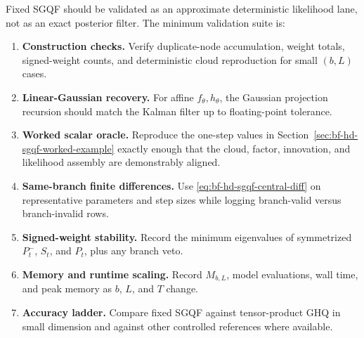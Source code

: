 Fixed SGQF should be validated as an approximate deterministic likelihood lane,
not as an exact posterior filter.  The minimum validation suite is:
\begin{enumerate}[leftmargin=0.28in]
  \item \textbf{Construction checks.}  Verify duplicate-node accumulation,
  weight totals, signed-weight counts, and deterministic cloud reproduction for
  small \((b,L)\) cases.
  \item \textbf{Linear-Gaussian recovery.}  For affine \(f_\theta,h_\theta\), the
  Gaussian projection recursion should match the Kalman filter up to
  floating-point tolerance.
  \item \textbf{Worked scalar oracle.}  Reproduce the one-step values in
  Section~\ref{sec:bf-hd-sgqf-worked-example} exactly enough that the cloud,
  factor, innovation, and likelihood assembly are demonstrably aligned.
  \item \textbf{Same-branch finite differences.}  Use
  \eqref{eq:bf-hd-sgqf-central-diff} on representative parameters and step
  sizes while logging branch-valid versus branch-invalid rows.
  \item \textbf{Signed-weight stability.}  Record the minimum eigenvalues of
  symmetrized \(P_t^-\), \(S_t\), and \(P_t\), plus any branch veto.
  \item \textbf{Memory and runtime scaling.}  Record \(M_{b,L}\), model
  evaluations, wall time, and peak memory as \(b\), \(L\), and \(T\) change.
  \item \textbf{Accuracy ladder.}  Compare fixed SGQF against tensor-product GHQ
  in small dimension and against other controlled references where available.
\end{enumerate}

